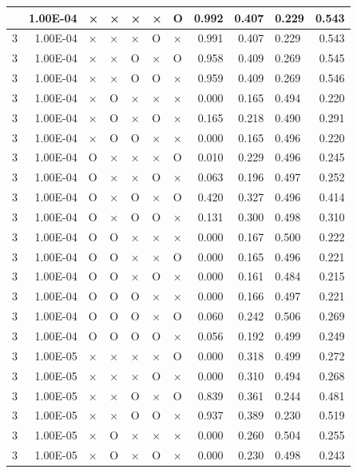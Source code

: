 \documentclass[11pt]{article}
\begin{document}
\begin{longtable}[h]{|r|r|l|l|l|l|l|r|r|l|r|}
\hline
\endlastfoot
3 & 1.00E-04 & × & × & × & × & O & 0.992 & 0.407 & 0.229 & 0.543 \\ \hline
3 & 1.00E-04 & × & × & × & O & × & 0.991 & 0.407 & 0.229 & 0.543 \\ \hline
3 & 1.00E-04 & × & × & O & × & O & 0.958 & 0.409 & 0.269 & 0.545 \\ \hline
3 & 1.00E-04 & × & × & O & O & × & 0.959 & 0.409 & 0.269 & 0.546 \\ \hline
3 & 1.00E-04 & × & O & × & × & × & 0.000 & 0.165 & 0.494 & 0.220 \\ \hline
3 & 1.00E-04 & × & O & × & O & × & 0.165 & 0.218 & 0.490 & 0.291 \\ \hline
3 & 1.00E-04 & × & O & O & × & × & 0.000 & 0.165 & 0.496 & 0.220 \\ \hline
3 & 1.00E-04 & O & × & × & × & O & 0.010 & 0.229 & 0.496 & 0.245 \\ \hline
3 & 1.00E-04 & O & × & × & O & × & 0.063 & 0.196 & 0.497 & 0.252 \\ \hline
3 & 1.00E-04 & O & × & O & × & O & 0.420 & 0.327 & 0.496 & 0.414 \\ \hline
3 & 1.00E-04 & O & × & O & O & × & 0.131 & 0.300 & 0.498 & 0.310 \\ \hline
3 & 1.00E-04 & O & O & × & × & × & 0.000 & 0.167 & 0.500 & 0.222 \\ \hline
3 & 1.00E-04 & O & O & × & × & O & 0.000 & 0.165 & 0.496 & 0.221 \\ \hline
3 & 1.00E-04 & O & O & × & O & × & 0.000 & 0.161 & 0.484 & 0.215 \\ \hline
3 & 1.00E-04 & O & O & O & × & × & 0.000 & 0.166 & 0.497 & 0.221 \\ \hline
3 & 1.00E-04 & O & O & O & × & O & 0.060 & 0.242 & 0.506 & 0.269 \\ \hline
3 & 1.00E-04 & O & O & O & O & × & 0.056 & 0.192 & 0.499 & 0.249 \\ \hline
3 & 1.00E-05 & × & × & × & × & O & 0.000 & 0.318 & 0.499 & 0.272 \\ \hline
3 & 1.00E-05 & × & × & × & O & × & 0.000 & 0.310 & 0.494 & 0.268 \\ \hline
3 & 1.00E-05 & × & × & O & × & O & 0.839 & 0.361 & 0.244 & 0.481 \\ \hline
3 & 1.00E-05 & × & × & O & O & × & 0.937 & 0.389 & 0.230 & 0.519 \\ \hline
3 & 1.00E-05 & × & O & × & × & × & 0.000 & 0.260 & 0.504 & 0.255 \\ \hline
3 & 1.00E-05 & × & O & × & O & × & 0.000 & 0.230 & 0.498 & 0.243 \\ \hline

\end{longtable}
\end{document}
